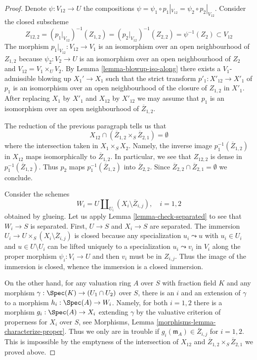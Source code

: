 \begin{proof}
\medskip\noindent
Denote $\psi : V_{12} \to U$ the compositions
$\psi = \psi_1 \circ p_1|_{V_{12}} = \psi_2 \circ p_2|_{V_{12}}$.
Consider the closed subscheme
$$
Z_{12, 2} =
(p_1|_{V_{12}})^{-1}(Z_{1, 2}) =
(p_2|_{V_{12}})^{-1}(Z_{2, 2}) =
\psi^{-1}(Z_2) \subset V_{12}
$$
The morphism $p_1|_{V_{12}} : V_{12} \to V_1$ is an isomorphism
over an open neighbourhood of $Z_{1, 2}$ because $\psi_2 : V_2 \to U$
is an isomorphism over an open neighbourhood of $Z_2$ and
$V_{12} = V_1 \times_U V_2$.
By Lemma \ref{lemma-blowup-iso-along}
there exists a $V_1$-admissible blowing up $X_1' \to X_1$
such that the strict transform $p'_1 : X'_{12} \to X'_1$
of $p_1$ is an isomorphism over an open neighbourhood of
the closure of $Z_{1, 2}$ in $X'_1$.
After replacing $X_1$ by $X'_1$ and $X_{12}$ by $X'_{12}$
we may assume that $p_1$ is an isomorphism over an open
neighbourhood of $\overline{Z}_{1, 2}$.

\medskip\noindent
The reduction of the previous paragraph tells us that
$$
X_{12} \cap (\overline{Z}_{1, 2} \times_S \overline{Z}_{2, 1}) = \emptyset
$$
where the intersection taken in $X_1 \times_S X_2$. Namely, the inverse
image $p_1^{-1}(\overline{Z}_{1, 2})$ in $X_{12}$ maps isomorphically
to $\overline{Z}_{1, 2}$. In particular, we see that $Z_{12, 2}$
is dense in $p_1^{-1}(\overline{Z}_{1, 2})$. Thus $p_2$ maps
$p_1^{-1}(\overline{Z}_{1, 2})$ into $\overline{Z}_{2, 2}$.
Since $\overline{Z}_{2, 2} \cap \overline{Z}_{2, 1} = \emptyset$
we conclude.

\medskip\noindent
Consider the schemes
$$
W_i = U \coprod\nolimits_{U_i} (X_i \setminus \overline{Z}_{i, j}),
\quad i = 1, 2
$$
obtained by glueing. Let us apply Lemma \ref{lemma-check-separated}
to see that $W_i \to S$ is separated. First,
$U \to S$ and $X_i \to S$ are separated. The immersion
$U_i \to U \times_S (X_i \setminus \overline{Z}_{i, j})$
is closed because any specialization $u_i \leadsto u$
with $u_i \in U_i$ and $u \in U \setminus U_i$
can be lifted uniquely to a specialization
$u_i \leadsto v_i$ in $V_i$ along the proper morphism
$\psi_i : V_i \to U$ and then $v_i$ must be in $Z_{i, j}$.
Thus the image of the immersion is closed, whence the immersion
is a closed immersion.

\medskip\noindent
On the other hand, for any valuation ring $A$ over $S$ with fraction field $K$
and any morphism $\gamma : \Spec(K) \to (U_1 \cap U_2)$ over $S$, there
is an $i$ and an extension of $\gamma$ to a morphism $h_i : \Spec(A) \to W_i$.
Namely, for both $i = 1, 2$ there is a morphism
$g_i : \Spec(A) \to X_i$ extending $\gamma$ by the
valuative criterion of properness for $X_i$ over $S$, see
Morphisms, Lemma \ref{morphisms-lemma-characterize-proper}.
Thus we only are in trouble
if $g_i(\mathfrak m_A) \in \overline{Z}_{i, j}$ for $i = 1, 2$. This is
impossible by the emptyness of the intersection of $X_{12}$ and
$\overline{Z}_{1, 2} \times_S \overline{Z}_{2, 1}$ we proved above.


\end{proof}
